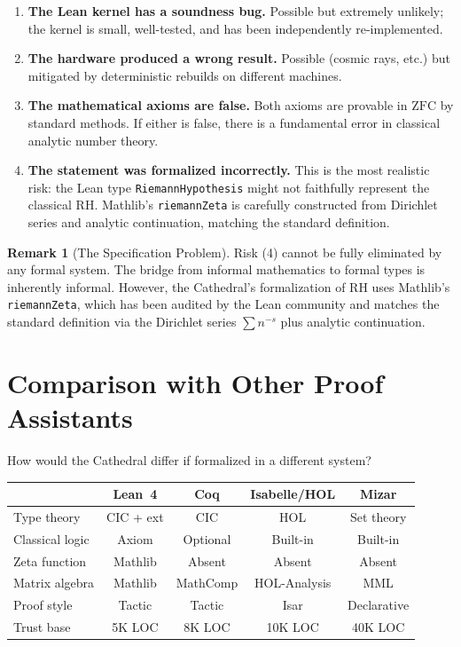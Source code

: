 \documentclass[11pt,a4paper]{article}
\theoremstyle{plain}
\theoremstyle{definition}
\newtheorem{remark}[theorem]{Remark}
\newcommand{\lean}[1]{\texttt{#1}}
\newcommand{\RH}{\ensuremath{\mathrm{RH}}}
\newcommand{\ZFC}{\mathrm{ZFC}}
\begin{document}
\begin{enumerate}
  \item \textbf{The Lean kernel has a soundness bug.} Possible but
    extremely unlikely; the kernel is small, well-tested, and has
    been independently re-implemented.
  \item \textbf{The hardware produced a wrong result.} Possible
    (cosmic rays, etc.) but mitigated by deterministic rebuilds on
    different machines.
  \item \textbf{The mathematical axioms are false.} Both axioms are
    provable in $\ZFC$ by standard methods. If either is false,
    there is a fundamental error in classical analytic number theory.
  \item \textbf{The statement was formalized incorrectly.} This is the
    most realistic risk: the Lean type \lean{RiemannHypothesis} might
    not faithfully represent the classical \RH. Mathlib's
    \lean{riemannZeta} is carefully constructed from Dirichlet series
    and analytic continuation, matching the standard definition.
\end{enumerate}

\begin{remark}[The Specification Problem]
Risk (4) cannot be fully eliminated by any formal system. The bridge
from informal mathematics to formal types is inherently informal.
However, the Cathedral's formalization of \RH{} uses Mathlib's
\lean{riemannZeta}, which has been audited by the Lean community
and matches the standard definition via the Dirichlet series
$\sum n^{-s}$ plus analytic continuation.
\end{remark}

\section{Comparison with Other Proof Assistants}
\label{sec:comparison}

How would the Cathedral differ if formalized in a different system?

\begin{center}
\small
\begin{tabular}{@{}lcccc@{}}
\toprule
& \textbf{Lean~4} & \textbf{Coq} & \textbf{Isabelle/HOL} & \textbf{Mizar} \\
\midrule
Type theory & CIC + ext & CIC & HOL & Set theory \\
Classical logic & Axiom & Optional & Built-in & Built-in \\
Zeta function & Mathlib & Absent & Absent & Absent \\
Matrix algebra & Mathlib & MathComp & HOL-Analysis & MML \\
Proof style & Tactic & Tactic & Isar & Declarative \\
Trust base & 5K LOC & 8K LOC & 10K LOC & 40K LOC \\
\bottomrule
\end{tabular}
\end{center}
\end{document}
